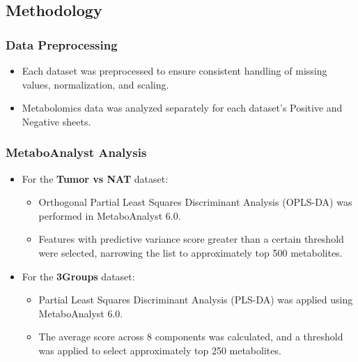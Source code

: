 \documentclass[a4paper,12pt]{article}
\begin{document}
\subsection{Methodology}

\subsubsection{Data Preprocessing}
\begin{itemize}
	\item Each dataset was preprocessed to ensure consistent handling of missing values, normalization, and scaling.
	\item Metabolomics data was analyzed separately for each dataset's Positive and Negative sheets.

\end{itemize}

\subsubsection{MetaboAnalyst Analysis}
\begin{itemize}
	\item For the \textbf{Tumor vs NAT} dataset:
	      \begin{itemize}
		      \item Orthogonal Partial Least Squares Discriminant Analysis (OPLS-DA) was performed in MetaboAnalyst 6.0.
		      \item Features with predictive variance score greater than a certain threshold were selected, narrowing the list to approximately top 500 metabolites.
	      \end{itemize}
	\item For the \textbf{3Groups} dataset:
	      \begin{itemize}
		      \item Partial Least Squares Discriminant Analysis (PLS-DA) was applied using MetaboAnalyst 6.0.
		      \item The average score across 8 components was calculated, and a threshold was applied to select approximately top 250 metabolites.
	      \end{itemize}
\end{itemize}
\end{document}
